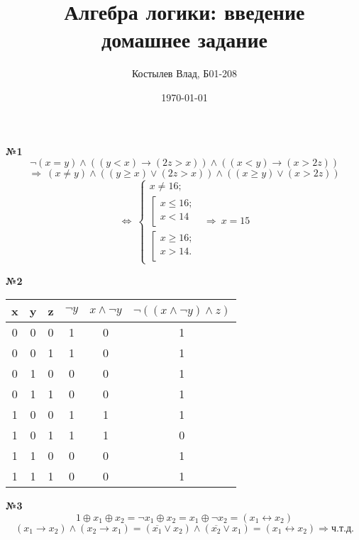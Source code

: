 \documentclass[a4paper, 12pt]{article}
\author{Костылев Влад, Б01-208}
\date{\today}
\title{\textbf{Алгебра логики: введение} \\ 
	домашнее задание}
\begin{document}
	\maketitle
	
	\textbf{№1}\
	\
	\[
		\neg(x = y) \wedge ((y < x) \rightarrow (2z > x)) \wedge ((x < y) \rightarrow (x > 2z)) 
	\]
	\[
		\Rightarrow \
		(x \not= y) \wedge ((y \geq x) \vee (2z > x)) \wedge ((x \geq y) \vee (x > 2z))
	\]
	\[
		\Leftrightarrow \
		\left\{ 
		\begin{gathered} 
			x \not= 16; \\
			\left[
			\begin{gathered}
				x \leq 16; \\ 
				x < 14     \\
			\end{gathered} 
			\right.
			\\
			\left[
			\begin{gathered}
				x \geq 16; \\ 
				x > 14.    \\
			\end{gathered} 
			\right.
		\end{gathered} 
		\right. \
		\Longrightarrow \
		x = 15
	\]
	
	\textbf{№2}\
	\
	\begin{table}[H]
	\centering	
	\begin{tabular}{|c|c|c|c|c|c|}
		\hline
		x & y & z & $\neg y$ & $x \wedge \neg y$ & $\neg((x \wedge \neg y) \wedge z)$\\ \hline
		0 & 0 & 0 & 1 & 0 & 1 \\ \hline
		0 & 0 & 1 & 1 & 0 & 1 \\ \hline
		0 & 1 & 0 & 0 & 0 & 1 \\ \hline
		0 & 1 & 1 & 0 & 0 & 1 \\ \hline	
		1 & 0 & 0 & 1 & 1 & 1 \\ \hline
		1 & 0 & 1 & 1 & 1 & 0 \\ \hline
		1 & 1 & 0 & 0 & 0 & 1 \\ \hline
	    1 & 1 & 1 & 0 & 0 & 1 \\ \hline
	\end{tabular}
	\end{table}

	\textbf{№3}\
	\
	\[
		1 \oplus x_1 \oplus x_2 = \neg x_1 \oplus x_2 = x_1 \oplus \neg x_2 = (x_1 \leftrightarrow x_2)
	\]
	\[
		(x_1 \rightarrow x_2) \wedge (x_2 \rightarrow x_1) = (\overline{x_1} \vee x_2) \wedge (\overline{x_2} \vee x_1) = (x_1 \leftrightarrow x_2) \Rightarrow ч.т.д.
	\]
	
\end{document}
